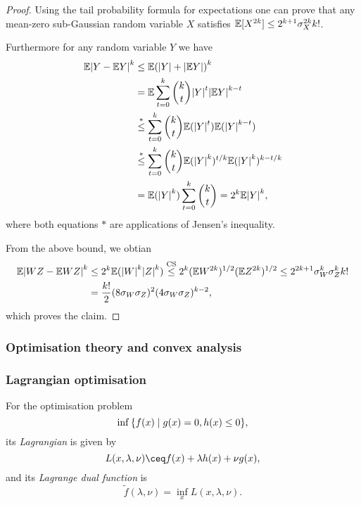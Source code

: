 \begin{proof}
	Using the tail probability formula for expectations one can prove that any mean-zero sub-Gaussian random variable $X$ satisfies $\mathbb E[X^{2k}] \leq 2^{k+1} \sigma_X^{2k} k!$. 
	
	Furthermore for any random variable $Y$ we have
	\begin{align*}
		\mathbb E\abs{Y - \mathbb E Y}^k &\leq \mathbb E\qty(\abs{Y} + \abs{\mathbb E Y})^k \\
		&= \mathbb E \sum_{t=0}^k \binom kt \abs{Y}^t \abs{\mathbb E Y}^{k-t} \\
		&\overset*\leq \sum_{t=0}^k \binom kt \mathbb E(\abs{Y}^t) \mathbb E(\abs{Y}^{k-t}) \\
		&\overset*\leq \sum_{t=0}^k \binom kt \mathbb E(\abs{Y}^k)^{t/k} \mathbb E(\abs{Y}^k)^{k - t/k} \\
		&= \mathbb E(\abs{Y}^k) \sum_{t=0}^k \binom kt = 2^k \mathbb E\abs{Y}^k,
	\end{align*}
where both equations $*$ are applications of Jensen's inequality. 

From the above bound, we obtian 
\begin{align*}
\mathbb E\abs{WZ - \mathbb E WZ}^k &\leq 2^k \mathbb E(\abs{W}^k \abs{Z}^k) \overset{\mathrm{CS}}\leq 2^k (\mathbb E W^{2k})^{1/2} (\mathbb E Z^{2k})^{1/2} \leq 2^{2k+1} \sigma_W^k \sigma_Z^k k! \\
&= \frac{k!}{2} (8\sigma_W\sigma_Z)^2 (4\sigma_W\sigma_Z)^{k-2},
\end{align*}
which proves the claim. 
\end{proof}

\subsubsection{Optimisation theory and convex analysis}
\subsubsection*{Lagrangian optimisation}
\begin{definition}
	For the optimisation problem
	\begin{equation} \label{eq:opt_primal}
	\inf \qty{f(x) \mid g(x) = 0, h(x) \leq 0},
	\end{equation}
 	its \emph{Lagrangian} is given by
 	\[
 	L(x, \lambda,\nu) \ceq f(x) + \lambda h(x) + \nu g(x),
 	\]
 	and its \emph{Lagrange dual function} is
 	\begin{equation} \label{eq:opt_dual}
 	\tilde f(\lambda, \nu) = \inf_x L(x, \lambda, \nu). 
 	\end{equation}
\end{definition}


